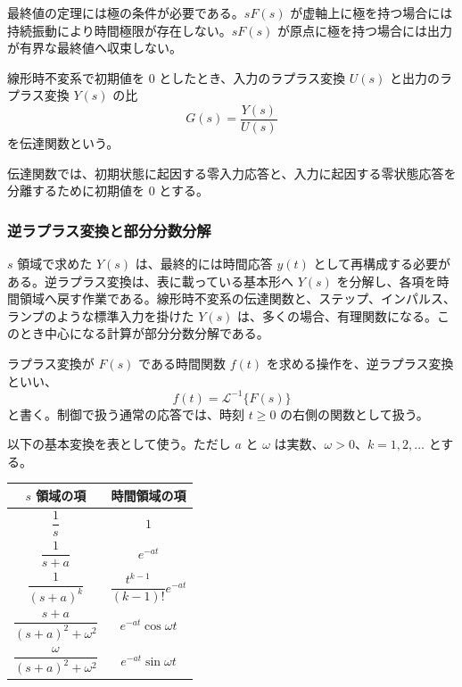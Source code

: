 最終値の定理には極の条件が必要である。$sF(s)$ が虚軸上に極を持つ場合には持続振動により時間極限が存在しない。$sF(s)$ が原点に極を持つ場合には出力が有界な最終値へ収束しない。

\begin{definition}[伝達関数]
線形時不変系で初期値を 0 としたとき、入力のラプラス変換 $U(s)$ と出力のラプラス変換 $Y(s)$ の比
\begin{equation}
  G(s)=\frac{Y(s)}{U(s)}
\end{equation}
を伝達関数という。
\end{definition}

伝達関数では、初期状態に起因する零入力応答と、入力に起因する零状態応答を分離するために初期値を 0 とする。

\subsubsection{逆ラプラス変換と部分分数分解}

$s$ 領域で求めた $Y(s)$ は、最終的には時間応答 $y(t)$ として再構成する必要がある。逆ラプラス変換は、表に載っている基本形へ $Y(s)$ を分解し、各項を時間領域へ戻す作業である。線形時不変系の伝達関数と、ステップ、インパルス、ランプのような標準入力を掛けた $Y(s)$ は、多くの場合、有理関数になる。このとき中心になる計算が部分分数分解である。

\begin{definition}[逆ラプラス変換]
ラプラス変換が $F(s)$ である時間関数 $f(t)$ を求める操作を、逆ラプラス変換といい、
\begin{equation}
  f(t)=\mathcal{L}^{-1}\{F(s)\}
\end{equation}
と書く。制御で扱う通常の応答では、時刻 $t\ge0$ の右側の関数として扱う。
\end{definition}

以下の基本変換を表として使う。ただし $a$ と $\omega$ は実数、$\omega>0$、$k=1,2,\ldots$ とする。
\begin{center}
\begin{tabular}{c|c}
$s$ 領域の項 & 時間領域の項\\ \hline
$\dfrac{1}{s}$ & $1$\\[1ex]
$\dfrac{1}{s+a}$ & $e^{-at}$\\[1ex]
$\dfrac{1}{(s+a)^k}$ & $\dfrac{t^{k-1}}{(k-1)!}e^{-at}$\\[1ex]
$\dfrac{s+a}{(s+a)^2+\omega^2}$ & $e^{-at}\cos\omega t$\\[1ex]
$\dfrac{\omega}{(s+a)^2+\omega^2}$ & $e^{-at}\sin\omega t$
\end{tabular}
\end{center}

